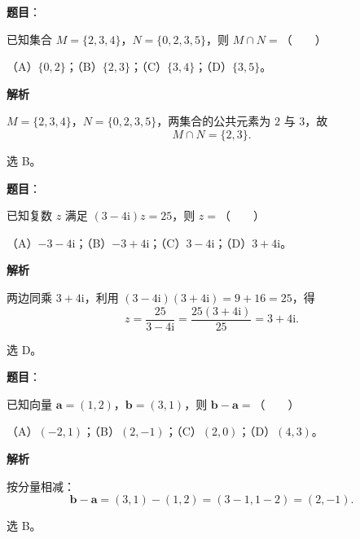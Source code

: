 

\begin{answer}

\textbf{题目}：

已知集合 $M=\{2,3,4\}$，$N=\{0,2,3,5\}$，则 $M\cap N=$\mbox{（　　）}

（A）$\{0,2\}$；（B）$\{2,3\}$；（C）$\{3,4\}$；（D）$\{3,5\}$。

\textbf{解析}

$M=\{2,3,4\}$，$N=\{0,2,3,5\}$，两集合的公共元素为 $2$ 与 $3$，故
\nopagebreak[4]
\[M\cap N=\{2,3\}.\]

选 B。


\end{answer}
\begin{answer}

\textbf{题目}：

已知复数 $z$ 满足 $(3-4\mathrm i)z=25$，则 $z=$\mbox{（　　）}

（A）$-3-4\mathrm i$；（B）$-3+4\mathrm i$；（C）$3-4\mathrm i$；（D）$3+4\mathrm i$。

\textbf{解析}

两边同乘 $3+4\mathrm i$，利用 $(3-4\mathrm i)(3+4\mathrm i)=9+16=25$，得
\nopagebreak[4]
\[z=\frac{25}{3-4\mathrm i}=\frac{25(3+4\mathrm i)}{25}=3+4\mathrm i.\]

选 D。


\end{answer}
\begin{answer}

\textbf{题目}：

已知向量 $\boldsymbol a=(1,2)$，$\boldsymbol b=(3,1)$，则 $\boldsymbol b-\boldsymbol a=$\mbox{（　　）}

（A）$(-2,1)$；（B）$(2,-1)$；（C）$(2,0)$；（D）$(4,3)$。

\textbf{解析}

按分量相减：
\nopagebreak[4]
\[\boldsymbol b-\boldsymbol a=(3,1)-(1,2)=(3-1,1-2)=(2,-1).\]

选 B。


\end{answer}
